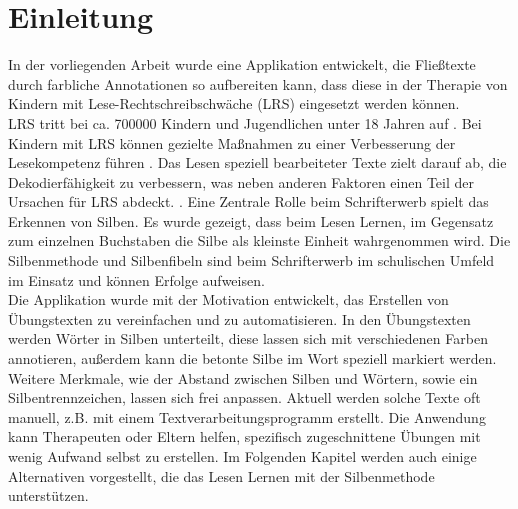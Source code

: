 
\chapter{Einleitung}

In der vorliegenden Arbeit wurde eine Applikation entwickelt, die Fließtexte durch farbliche Annotationen so aufbereiten kann, dass diese in der Therapie von Kindern mit Lese-Rechtschreibschwäche (LRS) eingesetzt werden können.\\

LRS tritt bei ca. 700000 Kindern und Jugendlichen unter 18 Jahren auf \cite{Schulte-Koerne2014} . Bei Kindern mit LRS können gezielte Maßnahmen zu einer Verbesserung der Lesekompetenz führen . Das Lesen speziell bearbeiteter Texte zielt darauf ab, die Dekodierfähigkeit zu verbessern, was neben anderen Faktoren einen Teil der Ursachen für LRS abdeckt. . Eine Zentrale Rolle beim Schrifterwerb spielt das Erkennen von Silben. Es wurde gezeigt, dass beim Lesen Lernen, im Gegensatz zum einzelnen Buchstaben die Silbe als kleinste Einheit wahrgenommen wird.  Die Silbenmethode und Silbenfibeln sind beim Schrifterwerb im schulischen Umfeld im Einsatz  und können Erfolge aufweisen.\\

Die Applikation wurde mit der Motivation entwickelt, das Erstellen von Übungstexten zu vereinfachen und zu automatisieren. In den Übungstexten werden Wörter in Silben unterteilt, diese lassen sich mit verschiedenen Farben annotieren, außerdem kann die betonte Silbe im Wort speziell markiert werden. Weitere Merkmale, wie der Abstand zwischen Silben und Wörtern, sowie ein Silbentrennzeichen, lassen sich frei anpassen. Aktuell werden solche Texte oft manuell, z.B. mit einem Textverarbeitungsprogramm erstellt. Die Anwendung kann Therapeuten oder Eltern helfen, spezifisch zugeschnittene Übungen mit wenig Aufwand selbst zu erstellen. Im Folgenden Kapitel werden auch einige Alternativen vorgestellt, die das Lesen Lernen mit der Silbenmethode unterstützen.\\







